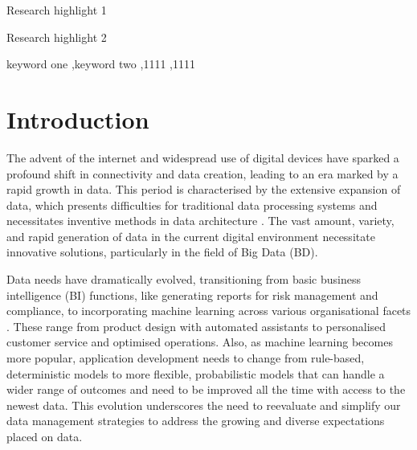 \documentclass[preprint,12pt]{elsarticle}
\begin{document}
\begin{frontmatter}

\begin{highlights}
\item Research highlight 1
\item Research highlight 2
\end{highlights}

\begin{keyword}
keyword one \sep keyword two
 \sep 1111
 \sep 1111
\end{keyword}

\end{frontmatter}


\section{Introduction}
\label{sec:introduction}

The advent of the internet and widespread use of digital devices have sparked a profound shift in connectivity and data creation, leading to an era marked by a rapid growth in data. This period is characterised by the extensive expansion of data, which presents difficulties for traditional data processing systems and necessitates inventive methods in data architecture \cite{AtaeiACIS,AtaeiBigDataEnvirons}. The vast amount, variety, and rapid generation of data in the current digital environment necessitate innovative solutions, particularly in the field of Big Data (BD).

Data needs have dramatically evolved, transitioning from basic business intelligence (BI) functions, like generating reports for risk management and compliance, to incorporating machine learning across various organisational facets \cite{ataei2023towards}. These range from product design with automated assistants to personalised customer service and optimised operations.  Also, as machine learning becomes more popular, application development needs to change from rule-based, deterministic models to more flexible, probabilistic models that can handle a wider range of outcomes and need to be improved all the time with access to the newest data. This evolution underscores the need to reevaluate and simplify our data management strategies to address the growing and diverse expectations placed on data.
\end{document}
